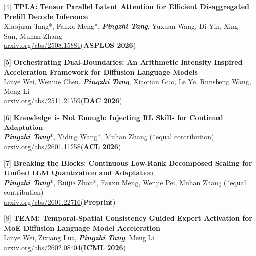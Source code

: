 \documentclass[11pt,a4paper]{article}
\renewcommand{\section}[1]{%
  \vspace{0.9em}%
  \noindent{\large\bfseries\sectionfont\color{headerblue}#1}%
  \vspace{-0.5em}%
  \par\noindent{\color{headerblue}\rule{\textwidth}{0.8pt}}%
  \vspace{0.3em}%
  \par
}
\newcommand{\myname}{\textbf{\textit{Pingzhi Tang}}}
\begin{document}
\medskip\noindent
{[4]} \textbf{TPLA: Tensor Parallel Latent Attention for Efficient Disaggregated Prefill Decode Inference}\\
Xiaojuan Tang*, Fanxu Meng*, \myname, Yuxuan Wang, Di Yin, Xing Sun, Muhan Zhang\\
\href{https://arxiv.org/abs/2508.15881}{arxiv.org/abs/2508.15881}\quad (\textbf{ASPLOS 2026})

\medskip\noindent
{[5]} \textbf{Orchestrating Dual-Boundaries: An Arithmetic Intensity Inspired Acceleration Framework for Diffusion Language Models}\\
Linye Wei, Wenjue Chen, \myname, Xiaotian Guo, Le Ye, Runsheng Wang, Meng Li\\
\href{https://arxiv.org/abs/2511.21759}{arxiv.org/abs/2511.21759}\quad (\textbf{DAC 2026})

\medskip\noindent
{[6]} \textbf{Knowledge is Not Enough: Injecting RL Skills for Continual Adaptation}\\
\myname*, Yiding Wang*, Muhan Zhang (*equal contribution)\\
\href{https://arxiv.org/abs/2601.11258}{arxiv.org/abs/2601.11258}\quad (\textbf{ACL 2026})

\medskip\noindent
{[7]} \textbf{Breaking the Blocks: Continuous Low-Rank Decomposed Scaling for Unified LLM Quantization and Adaptation}\\
\myname*, Ruijie Zhou*, Fanxu Meng, Wenjie Pei, Muhan Zhang (*equal contribution)\\
\href{https://arxiv.org/abs/2601.22716}{arxiv.org/abs/2601.22716}\quad (\textbf{Preprint})

\medskip\noindent
{[8]} \textbf{TEAM: Temporal-Spatial Consistency Guided Expert Activation for MoE Diffusion Language Model Acceleration}\\
Linye Wei, Zixiang Luo, \myname, Meng Li\\
\href{https://arxiv.org/abs/2602.08404}{arxiv.org/abs/2602.08404}\quad (\textbf{ICML 2026})

\section{Research Experience}
\end{document}
